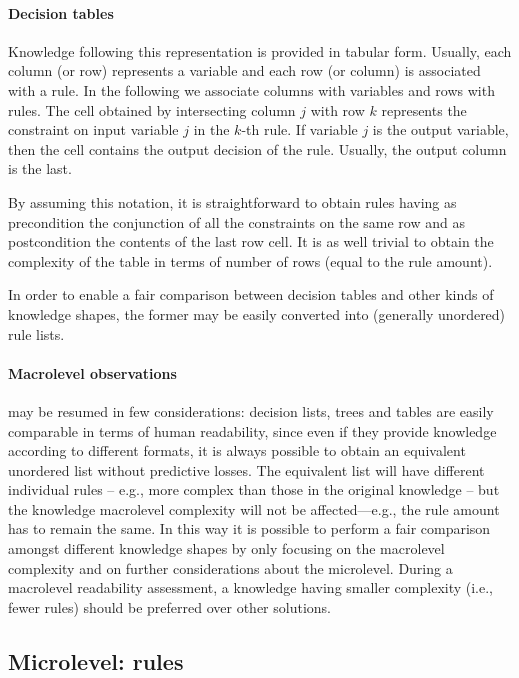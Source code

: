 \documentclass[sigconf]{acmart}
\begin{document}
\paragraph{Decision tables}

Knowledge following this representation is provided in tabular form.
%
Usually, each column (or row) represents a variable and each row (or column) is associated with a rule.
%
In the following we associate columns with variables and rows with rules.
%
The cell obtained by intersecting column $j$ with row $k$ represents the constraint on input variable $j$ in the $k$-th rule.
%
If variable $j$ is the output variable, then the cell contains the output decision of the rule.
%
Usually, the output column is the last.

By assuming this notation, it is straightforward to obtain rules having as precondition the conjunction of all the constraints on the same row and as postcondition the contents of the last row cell.
%
It is as well trivial to obtain the complexity of the table in terms of number of rows (equal to the rule amount).

In order to enable a fair comparison between decision tables and other kinds of knowledge shapes, the former may be easily converted into (generally unordered) rule lists.

\paragraph{Macrolevel observations}

 may be resumed in few considerations: decision lists, trees and tables are easily comparable in terms of human readability, since even if they provide knowledge according to different formats, it is always possible to obtain an equivalent unordered list without predictive losses.
%
The equivalent list will have different individual rules -- e.g., more complex than those in the original knowledge -- but the knowledge macrolevel complexity will not be affected---e.g., the rule amount has to remain the same.
%
In this way it is possible to perform a fair comparison amongst different knowledge shapes by only focusing on the macrolevel complexity and on further considerations about the microlevel.
%
During a macrolevel readability assessment, a knowledge having smaller complexity (i.e., fewer rules) should be preferred over other solutions.

\subsection{Microlevel: rules}
\end{document}

